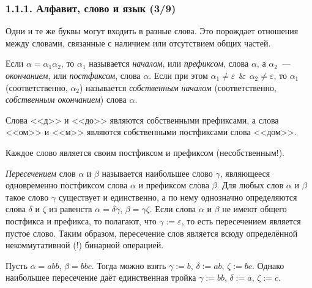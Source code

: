 \documentclass[mathserif,12pt,aspectratio=169]{beamer}
\renewcommand{\index}[1]{}
\def\odmkey#1#2{{\it\color{red} #1}\index{#2}}
\def\Assign{\operatorname{:=}}
\def\And{\operatorname{\,\&\,}}
\begin{document}
\begin{frame}
\frametitle{1.1.1. Алфавит, слово и язык (3/9)}

Одни и те же буквы могут входить в разные слова.
Это порождает отношения между словами,
связанные с наличием или отсутствием общих частей.

Если $\alpha=\alpha_1\alpha_2$, то $\alpha_1$ называется
\odmkey{началом}{Начало слова}, или \odmkey{префиксом}{Префикс},
слова $\alpha$, а $\alpha_2$~---
\odmkey{окончанием}{Окончание слова}, или
\odmkey{постфиксом}{Постфикс}, слова $\alpha$.
Если при этом $\alpha_1 \neq \varepsilon\And \alpha_2\neq\varepsilon$, то
$\alpha_1$ (соответственно, $\alpha_2$)
называется \odmkey{собственным началом}{Начало слова!собственное}
(соответственно, \odmkey{собственным окончанием}{Окончание
слова!собственное})
слова $\alpha$.

\begin{example}
Слова <<д>> и <<до>> являются собственными префиксами, а слова <<ом>> и <<м>>
являются собственными постфиксами слова <<дом>>.
\end{example}

\begin{remark}
Каждое слово является своим постфиксом и префиксом (несобственным!).
\end{remark}

\odmkey{Пересечением}{Пересечение!слов} слов $\alpha$ и $\beta$ называется
наибольшее слово $\gamma$, являющееся одновременно постфиксом слова $\alpha$ и
префиксом слова $\beta$. Для любых слов $\alpha$ и $\beta$ такое 
слово $\gamma$ существует и единственно, а по нему
однозначно определяются слова $\delta$ и $\zeta$ из равенств
$\alpha=\delta\gamma$, $\beta=\gamma\zeta$.
Если слова $\alpha$ и $\beta$ не имеют общего постфикса и префикса,
то полагают, что $\gamma\Assign\varepsilon$, то есть пересечением
является пустое слово. Таким образом,
пересечение слов является всюду определённой 
некоммутативной (!) бинарной операцией.


\begin{example}
Пусть $\alpha=abb$, $\beta=bbc$. Тогда можно
взять $\gamma\Assign b$, $\delta\Assign ab$, $\zeta\Assign bc$.
Однако наибольшее пересечение даёт единственная тройка
$\gamma\Assign bb$, $\delta\Assign a$, $\zeta\Assign c$.
\end{example}

\end{frame}
\end{document}

